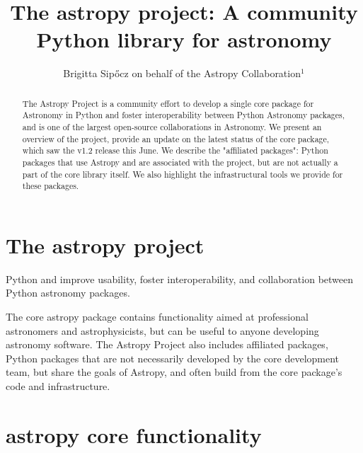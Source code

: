 \documentclass{iau}
\title[The astropy project] %
{The astropy project: A community Python library for astronomy}
\author[Brigitta Sip{\H o}cz on behalf of the Astropy Collaboration] %
{Brigitta Sip{\H o}cz on behalf of the Astropy Collaboration$^1$}
\affiliation{$^1$ email: {\tt bsipocz@gmail.com}}
\begin{document}
\maketitle

\begin{abstract}
The Astropy Project is a community effort to develop a single core package
for Astronomy in Python and foster interoperability between Python Astronomy
packages, and is one of the largest open-source collaborations in
Astronomy. We present an overview of the project, provide an update on the
latest status of the core package, which saw the v1.2 release this June. We
describe the "affiliated packages": Python packages that use Astropy and are
associated with the project, but are not actually a part of the core library
itself. We also highlight the infrastructural tools we provide for these
packages.
\end{abstract}

\firstsection %

\section{The astropy project}

Python and improve usability, foster interoperability, and collaboration
between Python astronomy packages.

The core astropy package contains functionality aimed at professional
astronomers and astrophysicists, but can be useful to anyone developing
astronomy software. The Astropy Project also includes affiliated packages,
Python packages that are not necessarily developed by the core development
team, but share the goals of Astropy, and often build from the core
package's code and infrastructure.

\section{astropy core functionality}
\end{document}
